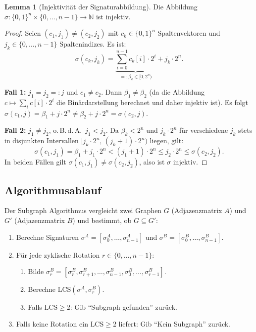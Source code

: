 ﻿\documentclass[a4paper,12pt]{article}
\theoremstyle{definition}
\newtheorem{lemma}{Lemma}
\begin{document}
\begin{lemma}[Injektivität der Signaturabbildung]
\label{lem:injektiv}
Die Abbildung $\sigma: \{0,1\}^n \times \{0,\ldots,n-1\} \to \mathbb{N}$ ist
injektiv.
\end{lemma}

\begin{proof}
Seien $(c_1, j_1) \neq (c_2, j_2)$ mit $c_k \in \{0,1\}^n$ Spaltenvektoren und
$j_k \in \{0,\ldots,n-1\}$ Spaltenindizes. Es ist:
\[
  \sigma(c_k, j_k) = \underbrace{\sum_{i=0}^{n-1} c_k[i] \cdot 2^i}_{=: \beta_k \in [0, 2^n)}
                   + j_k \cdot 2^n.
\]

\textbf{Fall 1:} $j_1 = j_2 =: j$ und $c_1 \neq c_2$.
Dann $\beta_1 \neq \beta_2$ (da die Abbildung $c \mapsto \sum_i c[i] \cdot 2^i$ die
Binärdarstellung berechnet und daher injektiv ist). Es folgt
$\sigma(c_1,j) = \beta_1 + j \cdot 2^n \neq \beta_2 + j \cdot 2^n = \sigma(c_2,j)$.

\textbf{Fall 2:} $j_1 \neq j_2$, o.\,B.\,d.\,A.\ $j_1 < j_2$.
Da $\beta_k < 2^n$ und $j_k \cdot 2^n$ für verschiedene $j_k$ stets in disjunkten
Intervallen $[j_k \cdot 2^n,\, (j_k+1) \cdot 2^n)$ liegen, gilt:
\[
  \sigma(c_1,j_1) = \beta_1 + j_1 \cdot 2^n < (j_1+1)\cdot 2^n
    \leq j_2 \cdot 2^n \leq \sigma(c_2,j_2).
\]
In beiden Fällen gilt $\sigma(c_1,j_1) \neq \sigma(c_2,j_2)$, also ist
$\sigma$ injektiv.
\end{proof}

\subsection{Algorithmusablauf}

Der Subgraph Algorithmus vergleicht zwei Graphen $G$ (Adjazenzmatrix $A$) und $G'$
(Adjazenzmatrix $B$) und bestimmt, ob $G \subseteq G'$:

\begin{enumerate}
  \item Berechne Signaturen $\sigma^A = [\sigma_0^A, \ldots, \sigma_{n-1}^A]$ und
        $\sigma^B = [\sigma_0^B, \ldots, \sigma_{n-1}^B]$.
  \item Für jede zyklische Rotation $r \in \{0,\ldots,n-1\}$:
    \begin{enumerate}
      \item Bilde $\sigma^B_r = [\sigma_r^B, \sigma_{r+1}^B, \ldots,
            \sigma_{n-1}^B, \sigma_0^B, \ldots, \sigma_{r-1}^B]$.
      \item Berechne $\mathrm{LCS}(\sigma^A, \sigma^B_r)$.
      \item Falls $\mathrm{LCS} \geq 2$: Gib ``Subgraph gefunden'' zurück.
    \end{enumerate}
  \item Falls keine Rotation ein $\mathrm{LCS} \geq 2$ liefert: Gib ``Kein Subgraph''
        zurück.
\end{enumerate}
\end{document}
